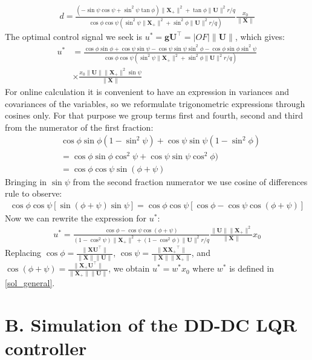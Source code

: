 \begin{align*}
    d = \frac{ (-\sin\psi\cos\psi + \sin^2\psi\tan\phi)\|\mathbf{X_+}\|^2 +\tan\phi\|\mathbf{U}\|^2 r/q}{\cos\phi\cos\psi(\sin^2\psi\|\mathbf{X_+}\|^2 + \sin^2\phi\|\mathbf{U}\|^2 r/q)} \frac{x_0}{\|\mathbf{X}\|} 
\end{align*}
The optimal control signal we seek is $u^*=\mathbf{g}\mathbf{U}^\top=|OF|\|\mathbf{U}\|$, which gives:
\begin{align*}
    u^* &= \frac{\cos\phi\sin\phi  + \cos\psi\sin\psi -\cos\psi\sin\psi\sin^2\phi -\cos\phi\sin\phi\sin^2\psi  }{\cos\phi\cos\psi(\sin^2\psi\|\mathbf{X_+}\|^2 + \sin^2\phi\|\mathbf{U}\|^2 r/q)} \\ &\times \frac{ x_0\|\mathbf{U}\|\|\mathbf{X_+}\|^2 \sin\psi}{\|\mathbf{X}\|}
\end{align*}
For online calculation it is convenient to have an expression in variances and covariances of the variables, so we reformulate trigonometric expressions through cosines only. For that purpose we group terms first and fourth, second and third from the numerator of the first fraction:
\begin{align*}
    &\cos\phi\sin\phi(1-\sin^2\psi)  + \cos\psi\sin\psi(1-\sin^2\phi) \\
    &=\cos\phi\sin\phi\cos^2\psi  + \cos\psi\sin\psi\cos^2\phi) \\ &=
\cos\phi\cos\psi\sin(\phi+\psi) 
\end{align*}
Bringing in $\sin\psi$ from the second fraction numerator we use cosine of differences rule to observe:
\begin{align*}
    \cos\phi\cos\psi\left[ \sin(\phi+\psi)\sin\psi \right] = \cos\phi\cos\psi\left[\cos\phi - \cos\psi\cos(\phi+\psi) \right]
\end{align*}
Now we can rewrite the expression for $u^*$:
\begin{align*}
    u^* = \frac{\cos\phi - \cos\psi\cos(\phi+\psi) }{(1-\cos^2\psi)\|\mathbf{X_+}\|^2 + (1-\cos^2\phi)\|\mathbf{U}\|^2 r/q}  \frac{ \|\mathbf{U}\|\|\mathbf{X_+}\|^2} {\|\mathbf{X}\|}x_0
\end{align*}
Replacing $\cos\phi=\tfrac{\|\mathbf{X}\mathbf{U}^\top\| }{\|\mathbf{X}\|\|\mathbf{U}\|}$, $\cos\psi=\tfrac{\|\mathbf{X}\mathbf{X_+}^\top\| }{\|\mathbf{X}\|\|\mathbf{X_+}\|}$, and $ \cos(\phi+\psi)=\tfrac{\|\mathbf{X_+}\mathbf{U}^\top\| }{\|\mathbf{X_+}\|\|\mathbf{U}\|}$, we obtain $u^*=w^* x_0$ where $w^*$ is defined in \eqref{sol_general}.


\section*{B. Simulation of the DD-DC LQR controller }

